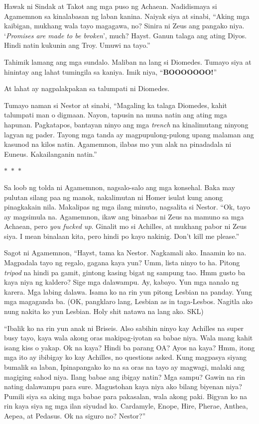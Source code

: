 \documentclass[12pt,letterpaper]{report}
\newcommand{\seperate}{\begin{center}$\ast$~$\ast$~$\ast$\end{center}}
\begin{document}
Hawak ni Sindak at Takot ang mga puso ng Achaean. Nadidismaya si Agamemnon sa kinalabasan ng laban kanina. Naiyak siya at sinabi, ``Aking mga kaibigan, mukhang wala tayo magagawa, no? Sinira ni Zeus ang pangako niya. `\textit{Promises are made to be broken}', much? Hayst. Ganun talaga ang ating Diyos. Hindi natin kukunin ang Troy. Umuwi na tayo.''

Tahimik lamang ang mga sundalo. Maliban na lang si Diomedes. Tumayo siya at hinintay ang lahat tumingila sa kaniya. Imik niya, ``\textbf{BOOOOOOO!}''

At lahat ay nagpalakpakan sa talumpati ni Diomedes. 

Tumayo naman si Nestor at sinabi, ``Magaling ka talaga Diomedes, kahit talumpati man o digmaan. Nayon, tapusin na muna natin ang ating mga hapunan. Pagkatapos, bantayan ninyo ang mga \textit{trench} na kinalimutang ninyong lagyan ng pader. Tayong mga tanda ay magpupulong-pulong upang malaman ang kasunod na kilos natin. Agamemnon, ilabas mo yun alak na pinadadala ni Euneus. Kakailanganin natin.''

\seperate

Sa loob ng tolda ni Agamemnon, nagsalo-salo ang mga konsehal. Baka may pulutan silang paa ng manok, nakalimutan ni Homer isulat kung anong pinagkakain nila. Makalipas ng mga ilang minuto, nagsalita si Nestor. ``Ok, tayo ay magsimula na. Agamemnon, ikaw ang binasbas ni Zeus na mamuno sa mga Achaean, pero \textit{you fucked up}. Ginalit mo si Achilles, at mukhang pabor ni Zeus siya. I mean binalaan kita, pero hindi po kayo nakinig. Don't kill me please.''

Sagot ni Agamemnon, ``Hayst, tama ka Nestor. Nagkamali ako. Inaamin ko na. Magpadala tayo ng regalo, gagana kaya yun? Umm, lista ninyo to ha. Pitong \textit{tripod} na hindi pa gamit, gintong kasing bigat ng sampung tao. Hmm gusto ba kaya niya ng kaldero? Sige mga dalawampu. Ay, kabayo. Yun mga nanalo ng karera. Mga labing dalawa. Isama ko na rin yun pitong Lesbian na panday. Yung mga magaganda ba. (OK, pangklaro lang, Lesbian as in taga-Lesbos. Nagitla ako nung nakita ko yun Lesbian. Holy shit natawa na lang ako. SKL)

``Ibalik ko na rin yun anak ni Briseis. Also sabihin ninyo kay Achilles na super busy tayo, kaya wala akong oras makipag-iyotan sa babae niya. Wala mang kahit isang kiss o yakap. Ok na kaya? Hindi ba parang OA? Ayos na kaya? Hmm, itong mga ito ay ibibigay ko kay Achilles, no questions asked. Kung magpasya siyang bumalik sa laban, Ipinapangako ko na sa oras na tayo ay magwagi, malaki ang magiging sahod niya. Ilang babae ang ibigay natin? Mga sampu? Gawin na rin nating dalawampu para sure. Magustohan kaya niya ako bilang biyenan niya? Pumili siya sa aking mga babae para pakasalan, wala akong paki. Bigyan ko na rin kaya siya ng mga ilan siyudad ko. Cardamyle, Enope, Hire, Pherae, Anthea, Aepea, at Pedasus. Ok na siguro no? Nestor?''
\end{document}
